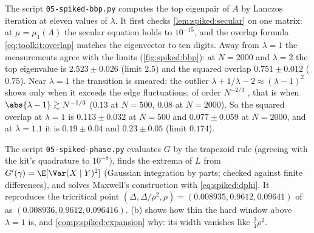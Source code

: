 \begin{refsection}
The script \texttt{05-spiked-bbp.py} computes the top eigenpair of $A$ by Lanczos iteration at eleven values of $\lambda$. It first checks \cref{lem:spiked:secular} on one matrix: at $\mu=\mu_1(A)$ the secular equation holds to $10^{-15}$, and the overlap formula \eqref{eq:toolkit:overlap} matches the eigenvector to ten digits. Away from $\lambda=1$ the measurements agree with the limits (\cref{fig:spiked:bbp}): at $N=2000$ and $\lambda=2$ the top eigenvalue is $2.523\pm0.026$ (limit $2.5$) and the squared overlap $0.751\pm0.012$ ($0.75$). Near $\lambda=1$ the transition is smeared: the outlier $\lambda+1/\lambda-2\approx(\lambda-1)^2$ shows only when it exceeds the edge fluctuations, of order $N^{-2/3}$ \parencite{FeralPeche2007}, that is when $\abs{\lambda-1}\gtrsim N^{-1/3}$ ($0.13$ at $N=500$, $0.08$ at $N=2000$). So the squared overlap at $\lambda=1$ is $0.113\pm0.032$ at $N=500$ and $0.077\pm0.059$ at $N=2000$, and at $\lambda=1.1$ it is $0.19\pm0.04$ and $0.23\pm0.05$ (limit $0.174$).

The script \texttt{05-spiked-phase.py} evaluates $G$ by the trapezoid rule (agreeing with the kit's quadrature to $10^{-8}$), finds the extrema of $L$ from $G'(\gamma)=\E[\Var(X\mid Y)^2]$ (Gaussian integration by parts; checked against finite differences), and solves Maxwell's construction with \eqref{eq:spiked:dphi}. It reproduces the tricritical point $(\Delta,\Delta/\rho^2,\rho)=(0.008935,0.9612,0.09641)$ of \textcite{LesieurKrzakalaZdeborova2017} as $(0.008936,0.9612,0.096416)$. (b) shows how thin the hard window above $\lambda=1$ is, and \cref{comp:spiked:expansion} why: its width vanishes like $\frac34\rho^2$.


\end{refsection}
